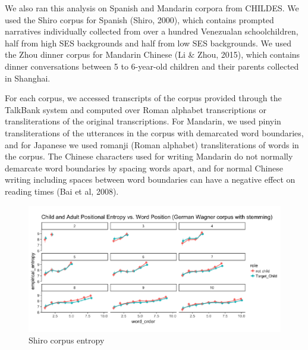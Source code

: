 \documentclass[10pt, letterpaper]{article}
\newenvironment{CodeChunk}{}{}
\begin{document}
We also ran this analysis on Spanish and Mandarin corpora from CHILDES.
We used the Shiro corpus for Spanish (Shiro, 2000), which contains
prompted narratives individually collected from over a hundred
Venezualan schoolchildren, half from high SES backgrounds and half from
low SES backgrounds. We used the Zhou dinner corpus for Mandarin Chinese
(Li \& Zhou, 2015), which contains dinner conversations between 5 to
6-year-old children and their parents collected in Shanghai.

For each corpus, we accessed transcripts of the corpus provided through
the TalkBank system and computed over Roman alphabet transcriptions or
transliterations of the original transcriptions. For Mandarin, we used
pinyin transliterations of the utterances in the corpus with demarcated
word boundaries, and for Japanese we used romanji (Roman alphabet)
transliterations of words in the corpus. The Chinese characters used for
writing Mandarin do not normally demarcate word boundaries by spacing
words apart, and for normal Chinese writing including spaces between
word boundaries can have a negative effect on reading times (Bai et al,
2008).

\begin{CodeChunk}
\begin{figure}[h]

{\centering \includegraphics{figs/shiro_PE-1} 

}

\caption[Shiro corpus entropy]{Shiro corpus entropy}\label{fig:shiro_PE}
\end{figure}
\end{CodeChunk}
\end{document}

